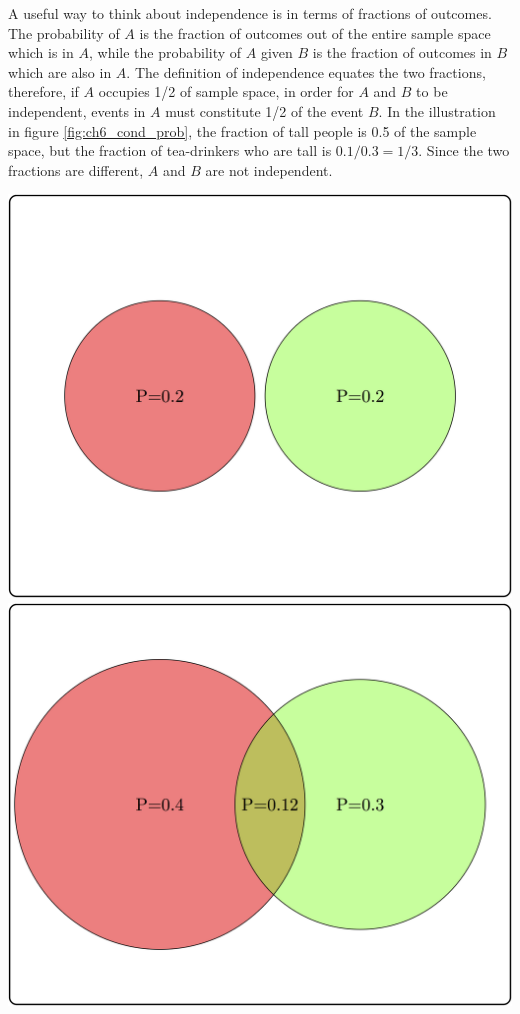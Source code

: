 \documentclass[
]{book}
\theoremstyle{definition}
\theoremstyle{definition}
\theoremstyle{definition}
\theoremstyle{remark}
\begin{document}
A useful way to think about independence is in terms of fractions of outcomes. The probability of \(A\) is the fraction of outcomes out of the entire sample space which is in \(A\), while the probability of \(A\) given \(B\) is the fraction of outcomes in \(B\) which are also in \(A\). The definition of independence equates the two fractions, therefore, if \(A\) occupies 1/2 of sample space, in order for \(A\) and \(B\) to be independent, events in \(A\) must constitute 1/2 of the event \(B\). In the illustration in figure \ref{fig:ch6_cond_prob}, the fraction of tall people is 0.5 of the sample space, but the fraction of tea-drinkers who are tall is \(0.1/0.3=1/3\). Since the two fractions are different, \(A\) and \(B\) are not independent.

\includegraphics{ch6/indep_ex1.png}
\includegraphics{ch6/indep_ex2.png}
\end{document}
